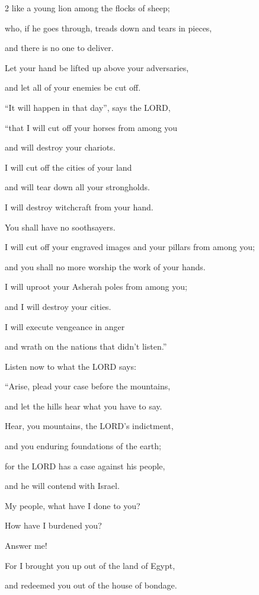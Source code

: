 \begin{multicols}{2}
like a young lion among the flocks of sheep;

who, if he goes through, treads down and tears in pieces,

and there is no one to deliver.

\myverse{}Let your hand be lifted up above your adversaries,

and let all of your enemies be cut off.

\myverse{}“It will happen in that day”, says the LORD,

“that I will cut off your horses from among you

and will destroy your chariots.

\myverse{}I will cut off the cities of your land

and will tear down all your strongholds.

\myverse{}I will destroy witchcraft from your hand.

You shall have no soothsayers.

\myverse{}I will cut off your engraved images and your pillars from among
you;

and you shall no more worship the work of your hands.

\myverse{}I will uproot your Asherah poles from among you;

and I will destroy your cities.

\myverse{}I will execute vengeance in anger

and wrath on the nations that didn’t listen.”


\mychapter{} \myverse*{}Listen now to what the LORD says:

“Arise, plead your case before the mountains,

and let the hills hear what you have to say.

\myverse{}Hear, you mountains, the LORD’s indictment,

and you enduring foundations of the earth;

for the LORD has a case against his people,

and he will contend with Israel.

\myverse{}My people, what have I done to you?

How have I burdened you?

Answer me!

\myverse{}For I brought you up out of the land of Egypt,

and redeemed you out of the house of bondage.


\end{multicols}
